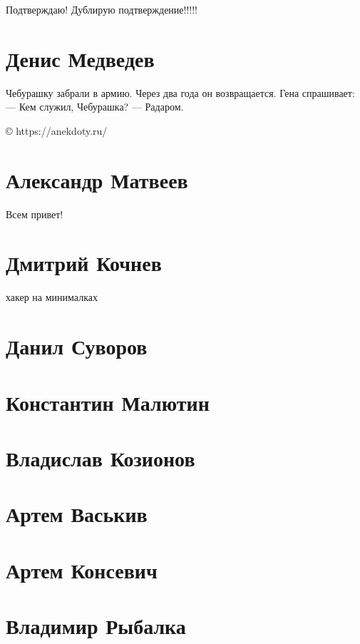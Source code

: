 \documentclass{article}
\begin{document}
Подтверждаю! Дублирую подтверждение!!!!!

\section*{Денис Медведев}

Чебурашку забрали в армию. Через два года он возвращается. Гена спрашивает:
— Кем служил, Чебурашка?
— Радаром.

© https://anekdoty.ru/
\section*{Александр Матвеев}

Всем привет!


\section*{Дмитрий Кочнев}
хакер на минималках
\section*{Данил Суворов}

\section*{Константин Малютин}

\section*{Владислав Козионов}

\section*{Артем Васькив}

\section*{Артем Консевич}

\section*{Владимир Рыбалка}
\end{document}
